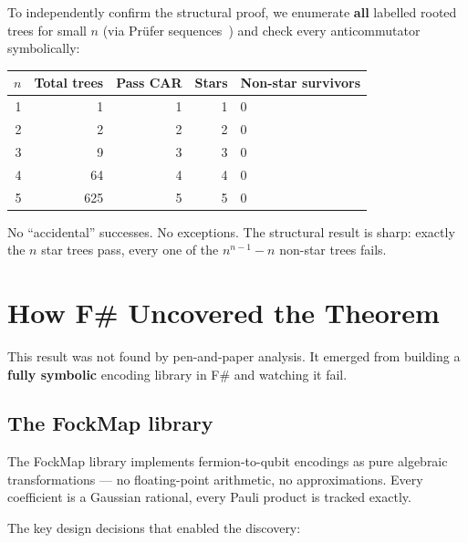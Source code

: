 \documentclass[11pt,a4paper]{article}
\theoremstyle{definition}
\begin{document}
To independently confirm the structural proof, we enumerate
\textbf{all} labelled rooted trees for small $n$ (via Pr\"ufer
sequences~\cite{prufer1918}) and check every anticommutator symbolically:

\begin{center}
\begin{tabular}{@{}rrrrl@{}}
\toprule
$n$ & Total trees & Pass CAR & Stars & Non-star survivors \\
\midrule
1 &       1 &   1 &   1 & 0 \\
2 &       2 &   2 &   2 & 0 \\
3 &       9 &   3 &   3 & 0 \\
4 &      64 &   4 &   4 & 0 \\
5 &     625 &   5 &   5 & 0 \\
\bottomrule
\end{tabular}
\end{center}

No ``accidental'' successes.  No exceptions.  The structural result is
sharp: exactly the $n$ star trees pass, every one of the $n^{n-1} - n$
non-star trees fails.

\section{How F\# Uncovered the Theorem}
\label{sec:fsharp}

This result was not found by pen-and-paper analysis.  It emerged from
building a \textbf{fully symbolic} encoding library in F\# and watching
it fail.

\subsection{The FockMap library}

The FockMap library implements fermion-to-qubit encodings as pure
algebraic transformations --- no floating-point arithmetic, no
approximations.  Every coefficient is a Gaussian rational, every Pauli
product is tracked exactly.

The key design decisions that enabled the discovery:
\end{document}
